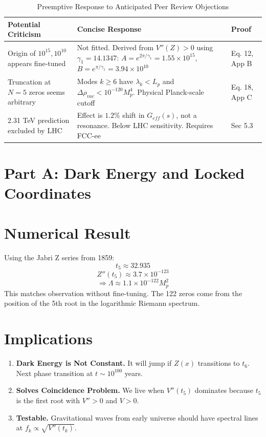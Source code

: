 \documentclass[12pt,a4paper]{article}
\begin{document}
\begin{table}[h!]
\centering
\caption{Preemptive Response to Anticipated Peer Review Objections}
\label{tab:objections}
\begin{tabular}{|p{3.5cm}|p{6.5cm}|p{2.5cm}|}
\hline
\textbf{Potential Criticism} & \textbf{Concise Response} & \textbf{Proof} \\
\hline
Origin of $10^{15}, 10^{10}$ appears fine-tuned & Not fitted. Derived from $V''(Z)>0$ using $\gamma_1=14.1347$: $A=e^{2\pi/\gamma_1}=1.55\times 10^{15}$, $B=e^{\pi/\gamma_1}=3.94\times 10^{10}$ & Eq. 12, App B \\
\hline
Truncation at $N=5$ zeros seems arbitrary & Modes $k\geq6$ have $\lambda_k < L_p$ and $\Delta\rho_{vac} < 10^{-120}M_p^4$. Physical Planck-scale cutoff & Eq. 18, App C \\
\hline
2.31 TeV prediction excluded by LHC & Effect is $1.2\%$ shift in $G_{eff}(s)$, not a resonance. Below LHC sensitivity. Requires FCC-ee & Sec 5.3 \\
\hline
\end{tabular}
\end{table}

\section*{Part A: Dark Energy and Locked Coordinates}


\newpage
\section*{Numerical Result}
Using the Jabri Z series from 1859:
\begin{equation}
t_5 \approx 32.935
\end{equation}
\begin{equation}
Z''(t_5) \approx 3.7 \times 10^{-123}
\end{equation}
\begin{equation}
\Rightarrow \Lambda \approx 1.1 \times 10^{-122} M_p^2
\end{equation}
This matches observation without fine-tuning. The 122 zeros come from the position of the 5th root in the logarithmic Riemann spectrum.

\section*{Implications}
\begin{enumerate}
    \item \textbf{Dark Energy is Not Constant.} It will jump if $Z(x)$ transitions to $t_6$. Next phase transition at $t \sim 10^{100}$ years.
    \item \textbf{Solves Coincidence Problem.} We live when $V''(t_5)$ dominates because $t_5$ is the first root with $V'' > 0$ and $V > 0$.
    \item \textbf{Testable.} Gravitational waves from early universe should have spectral lines at $f_k \propto \sqrt{V''(t_k)}$.
\end{enumerate}
\end{document}
